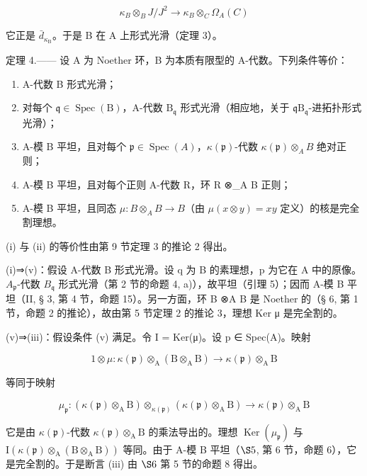 \[
\kappa_ {B} \otimes_ {B} J / J ^ {2} \longrightarrow \kappa_ {B} \otimes_ {C} \Omega_ {A} (C)
\]

它正是 \(\bar{d}_{\kappa_{\mathrm{B}}}\)。于是 B 在 A 上形式光滑（定理 3）。

定理 4.—— 设 A 为 Noether 环，B 为本质有限型的 A-代数。下列条件等价：

\begin{enumerate}
\def\labelenumi{(\roman{enumi})}
\item
  A-代数 B 形式光滑；
\item
  对每个 \(\mathfrak{q} \in \operatorname{Spec}(\mathrm{B})\)，A-代数 \(\mathrm{B}_{\mathfrak{q}}\) 形式光滑（相应地，关于 \(\mathfrak{q}\mathrm{B}_{\mathfrak{q}}\)-进拓扑形式光滑）；
\item
  A-模 B 平坦，且对每个 \(\mathfrak{p} \in \operatorname{Spec}(A)\)，\(\kappa(\mathfrak{p})\)-代数 \(\kappa(\mathfrak{p}) \otimes_{A} B\) 绝对正则；
\item
  A-模 B 平坦，且对每个正则 A-代数 R，环 R ⊗\_A B 正则；
\item
  A-模 B 平坦，且同态 \(\mu:B\otimes_{A}B\to B\)（由 \(\mu(x\otimes y)=xy\) 定义）的核是完全割理想。
\end{enumerate}

(i) 与 (ii) 的等价性由第 9 节定理 3 的推论 2 得出。

(i)⇒(v)：假设 A-代数 B 形式光滑。设 q 为 B 的素理想，p 为它在 A 中的原像。\(A_{\mathfrak{p}}\)-代数 \(B_{\mathfrak{q}}\) 形式光滑（第 2 节的命题 4, a)），故平坦（引理 5）；因而 A-模 B 平坦（II, § 3, 第 4 节，命题 15）。另一方面，环 B ⊗A B 是 Noether 的（§ 6, 第 1 节，命题 2 的推论），故由第 5 节定理 2 的推论 3，理想 Ker μ 是完全割的。

(v)⇒(iii)：假设条件 (v) 满足。令 I = Ker(μ)。设 p ∈ Spec(A)。映射

\[
1 \otimes \mu : \kappa (\mathfrak {p}) \otimes_ {\mathrm{A}} (\mathrm{B} \otimes_ {\mathrm{A}} \mathrm{B}) \rightarrow \kappa (\mathfrak {p}) \otimes_ {\mathrm{A}} \mathrm{B}
\]

等同于映射

\[
\mu_ {\mathfrak {p}}: (\kappa (\mathfrak {p}) \otimes_ {\mathrm{A}} \mathrm{B}) \otimes_ {\kappa (\mathfrak {p})} (\kappa (\mathfrak {p}) \otimes_ {\mathrm{A}} \mathrm{B}) \rightarrow \kappa (\mathfrak {p}) \otimes_ {\mathrm{A}} \mathrm{B}
\]

它是由 \(\kappa(\mathfrak{p})\)-代数 \(\kappa(\mathfrak{p})\otimes_{\mathrm{A}}\mathrm{B}\) 的乘法导出的。理想 \(\operatorname{Ker}(\mu_{\mathfrak{p}})\) 与 \(\mathrm{I}(\kappa(\mathfrak{p})\otimes_{\mathrm{A}}(\mathrm{B}\otimes_{\mathrm{A}}\mathrm{B}))\) 等同。由于 A-模 B 平坦（\(\S 5\), 第 6 节，命题 6），它是完全割的。于是断言 (iii) 由 \(\S 6\) 第 5 节的命题 8 得出。

